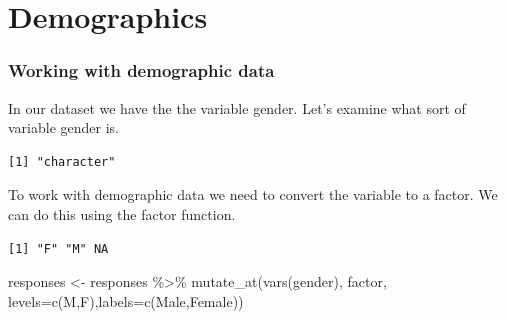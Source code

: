 \documentclass[
  letterpaper,
  DIV=11,
  numbers=noendperiod]{scrreprt}
\newenvironment{Shaded}{\begin{snugshade}}{\end{snugshade}}
\newcommand{\AttributeTok}[1]{\textcolor[rgb]{0.40,0.45,0.13}{#1}}
\newcommand{\CommentTok}[1]{\textcolor[rgb]{0.37,0.37,0.37}{#1}}
\newcommand{\FunctionTok}[1]{\textcolor[rgb]{0.28,0.35,0.67}{#1}}
\newcommand{\NormalTok}[1]{\textcolor[rgb]{0.00,0.23,0.31}{#1}}
\newcommand{\OtherTok}[1]{\textcolor[rgb]{0.00,0.23,0.31}{#1}}
\newcommand{\SpecialCharTok}[1]{\textcolor[rgb]{0.37,0.37,0.37}{#1}}
\newcommand{\StringTok}[1]{\textcolor[rgb]{0.13,0.47,0.30}{#1}}
\begin{document}
\hypertarget{demographics}{%
\chapter{Demographics}\label{demographics}}

\hypertarget{working-with-demographic-data}{%
\subsection{Working with demographic
data}\label{working-with-demographic-data}}

In our dataset we have the the variable gender. Let's examine what sort
of variable gender is.

\begin{Shaded}
\end{Shaded}

\begin{verbatim}
[1] "character"
\end{verbatim}

To work with demographic data we need to convert the variable to a
factor. We can do this using the factor function.

\begin{Shaded}
\end{Shaded}

\begin{verbatim}
[1] "F" "M" NA 
\end{verbatim}

\begin{Shaded}
\begin{Highlighting}[]
\NormalTok{responses }\OtherTok{\textless{}{-}}\NormalTok{ responses }\SpecialCharTok{\%\textgreater{}\%} 
  \FunctionTok{mutate\_at}\NormalTok{(}\FunctionTok{vars}\NormalTok{(gender), factor, }\AttributeTok{levels=}\FunctionTok{c}\NormalTok{(}\StringTok{\textquotesingle{}M\textquotesingle{}}\NormalTok{,}\StringTok{\textquotesingle{}F\textquotesingle{}}\NormalTok{),}\AttributeTok{labels=}\FunctionTok{c}\NormalTok{(}\StringTok{\textquotesingle{}Male\textquotesingle{}}\NormalTok{,}\StringTok{\textquotesingle{}Female\textquotesingle{}}\NormalTok{))}
\end{Highlighting}
\end{Shaded}
\end{document}
